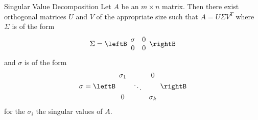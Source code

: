 \begin{theorem}{Singular Value Decomposition}\label{thm:singvaldecomp}
Let $A$ be an $m\times n$ matrix. Then there exist
orthogonal matrices $U$ and $V$ of the appropriate size such that $A= U \Sigma V^T$ where $\Sigma$ is of the form
\[
\Sigma = 
\leftB 
\begin{array}{cc}
\sigma & 0 \\ 
0 & 0
\end{array}
\rightB
\]
and $\sigma $ is of the form 
\[
\sigma =\leftB 
\begin{array}{ccc}
\sigma _{1} &  & 0 \\ 
& \ddots &  \\ 
0 &  & \sigma _{k}
\end{array}
\rightB
\]
for the $\sigma _{i}$ the singular values of $A.$
\end{theorem}

